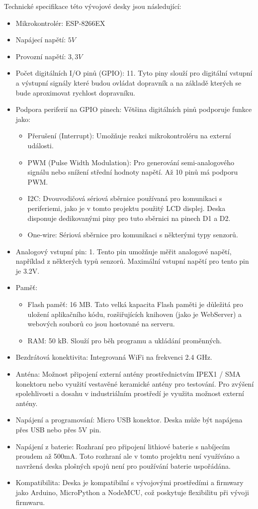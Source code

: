 Technické specifikace této vývojové desky jsou následující: \cite{ESP8266EXDatasheet, D1MiniProDokumentace}
\begin{itemize}
	\item Mikrokontrolér: ESP-8266EX
	\item Napájecí napětí: $5V$
	\item Provozní napětí: $3,3V$
	\item Počet digitálních I/O pinů (GPIO): 11. Tyto piny slouží pro digitální vstupní a výstupní signály které budou ovládat dopravník a na základě kterých se bude aproximovat rychlost dopravníku.
	\item Podpora periferií na GPIO pinech: Většina digitálních pinů podporuje funkce jako:
	\begin{itemize}
		\item Přerušení (Interrupt): Umožňuje reakci mikrokontroléru na externí události.
		\item PWM (Pulse Width Modulation): Pro generování semi-analogového signálu nebo snížení střední hodnoty napětí. Až 10 pinů má podporu PWM.
		\item I2C: Dvouvodičová sériová sběrnice používaná pro komunikaci s periferiemi, jako je v tomto projektu použitý LCD displej. Deska disponuje dedikovanými piny pro tuto sběrnici na pinech D1 a D2.
		\item One-wire: Sériová sběrnice pro komunikaci s některými typy senzorů.
	\end{itemize}
	\item Analogový vstupní pin: 1. Tento pin umožňuje měřit analogové napětí, například z některých typů senzorů. Maximální vstupní napětí pro tento pin je 3.2V.
	\item Paměť:
	\begin{itemize}
		\item Flash paměť: 16 MB. Tato velká kapacita Flash paměti je důležitá pro uložení aplikačního kódu, rozšiřujících knihoven (jako je WebServer) a webových souborů co jsou hostované na serveru.
		\item RAM: 50 kB. Slouží pro běh programu a ukládání proměnných.
	\end{itemize}
	\item Bezdrátová konektivita: Integrovaná WiFi na frekvenci 2.4 GHz.
	\item Anténa: Možnost připojení externí antény prostřednictvím IPEX1 / SMA konektoru nebo využití vestavěné keramické antény pro testování. Pro zvýšení spolehlivosti a dosahu v industriálním prostředí je využita možnost externí antény.
	\item Napájení a programování: Micro USB konektor. Deska může být napájena přes USB nebo přes 5V pin.
	\item Napájení z baterie: Rozhraní pro připojení lithiové baterie s nabíjecím proudem až 500mA. Toto rozhraní ale v tomto projektu není využíváno a navržená deska plošných spojů není pro používání baterie uspořádána.
	\item Kompatibilita: Deska je kompatibilní s vývojovými prostředími a firmwary jako Arduino, MicroPython a NodeMCU, což poskytuje flexibilitu při vývoji firmwaru.
\end{itemize}

